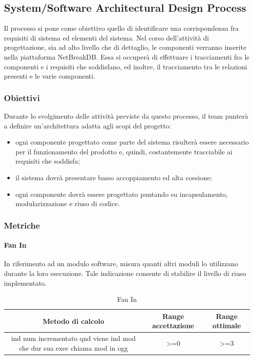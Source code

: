 	\subsection{System/Software Architectural Design Process}
	Il processo si pone come obiettivo quello di identificare una corrispondenza fra requisiti di sistema ed elementi del sistema. Nel corso dell’attività di progettazione, sia ad alto livello che di dettaglio, le componenti verranno inserite nella piattaforma NetBreakDB. Essa si occuperà di effettuare i tracciamenti fra le componenti e i requisiti che soddisfano, ed inoltre, il tracciamento tra le relazioni presenti e le varie componenti.
		\subsubsection{Obiettivi}
		Durante lo svolgimento delle attività previste da questo processo, il team punterà a definire
		un’architettura adatta agli scopi del progetto:
		\begin{itemize}
			\item ogni componente progettato come parte del sistema risulterà essere necessario per il funzionamento del prodotto e, quindi, costantemente tracciabile ai requisiti che soddisfa;
			\item il sistema dovrà presentare basso accoppiamento ed alta coesione;
			\item ogni componente dovrà essere progettato puntando su incapsulamento, modularizzazione
			e riuso di codice.
		\end{itemize}
		
		\subsubsection{Metriche}
			\paragraph{Fan In}
			In riferimento ad un modulo software, misura quanti altri moduli lo utilizzano durante la
			loro esecuzione.
			Tale indicazione consente di stabilire il livello di riuso implementato.
			\begin{table}[H]
				\begin{center}
					\begin{tabular}{|c|c|c|}
						\hline
						\textbf{Metodo di calcolo} & \textbf{Range accettazione} & \textbf{Range ottimale} \\
						\hline
						ind num incrementato qnd viene ind mod che dur sua exec chiama mod in ogg & >=0  & >=3 \\
						\hline
					\end{tabular}
				\end{center}
				\caption{Fan In}
			\end{table}
			
